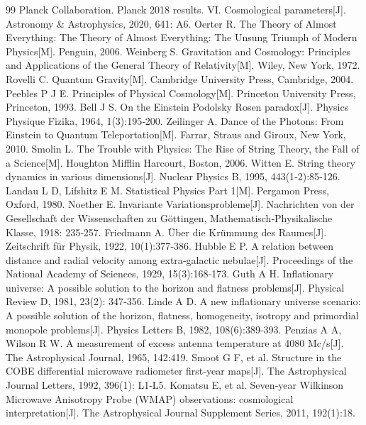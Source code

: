 \documentclass[12pt,a4paper]{article}
\begin{document}
\begin{thebibliography}{99}
 Planck Collaboration. Planck 2018 results. VI. Cosmological parameters[J]. Astronomy \& Astrophysics, 2020, 641: A6.
 Oerter R. The Theory of Almost Everything: The Theory of Almost Everything: The Unsung Triumph of Modern Physics[M]. Penguin, 2006.
 Weinberg S. Gravitation and Cosmology: Principles and Applications of the General Theory of Relativity[M]. Wiley, New York, 1972.
 Rovelli C. Quantum Gravity[M]. Cambridge University Press, Cambridge, 2004.
 Peebles P J E. Principles of Physical Cosmology[M]. Princeton University Press, Princeton, 1993.
 Bell J S. On the Einstein Podolsky Rosen paradox[J]. Physics Physique Fizika, 1964, 1(3):195‑200.
 Zeilinger A. Dance of the Photons: From Einstein to Quantum Teleportation[M]. Farrar, Straus and Giroux, New York, 2010.
 Smolin L. The Trouble with Physics: The Rise of String Theory, the Fall of a Science[M]. Houghton Mifflin Harcourt, Boston, 2006.
 Witten E. String theory dynamics in various dimensions[J]. Nuclear Physics B, 1995, 443(1‑2):85‑126.
 Landau L D, Lifshitz E M. Statistical Physics Part 1[M]. Pergamon Press, Oxford, 1980.
 Noether E. Invariante Variationsprobleme[J]. Nachrichten von der Gesellschaft der Wissenschaften zu Göttingen, Mathematisch‑Physikalische Klasse, 1918: 235‑257.
 Friedmann A. Über die Krümmung des Raumes[J]. Zeitschrift für Physik, 1922, 10(1):377‑386.
 Hubble E P. A relation between distance and radial velocity among extra‑galactic nebulae[J]. Proceedings of the National Academy of Sciences, 1929, 15(3):168‑173.
 Guth A H. Inflationary universe: A possible solution to the horizon and flatness problems[J]. Physical Review D, 1981, 23(2): 347‑356.
 Linde A D. A new inflationary universe scenario: A possible solution of the horizon, flatness, homogeneity, isotropy and primordial monopole problems[J]. Physics Letters B, 1982, 108(6):389‑393.
 Penzias A A, Wilson R W. A measurement of excess antenna temperature at 4080 Mc/s[J]. The Astrophysical Journal, 1965, 142:419.
 Smoot G F, et al. Structure in the COBE differential microwave radiometer first‑year maps[J]. The Astrophysical Journal Letters, 1992, 396(1): L1‑L5.
 Komatsu E, et al. Seven‑year Wilkinson Microwave Anisotropy Probe (WMAP) observations: cosmological interpretation[J]. The Astrophysical Journal Supplement Series, 2011, 192(1):18.

\end{thebibliography}
\end{document}
